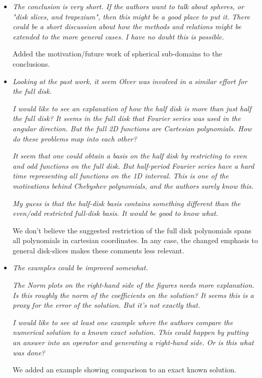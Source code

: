 \documentclass[10pt]{letter}
\newcommand{\comment}[1]{\textit{\color{bluey}#1}}
\begin{document}
\begin{itemize}[parsep=1em,leftmargin=1em]
\item \comment{The conclusion is very short. If the authors want to talk about spheres, or "disk slices, and trapezium", then this might be a good place to put it. There could be a short discussion about how the methods and relations might be extended to the more general cases. I have no doubt this is possible.}

Added the motivation/future work of spherical sub-domains to the conclusions.


\item \comment{Looking at the past work, it seem Olver was involved in a similar effort for the full disk.}

\comment{I would like to see an explanation of how the half disk is more than just half the full disk? It seems in the full disk that Fourier series was used in the angular direction. But the full 2D functions are Cartesian polynomials. How do these problems map into each other? }

\comment{It seem that one could obtain a basis on the half disk by restricting to even and odd functions on the full disk. But half-period Fourier series have a hard time representing all functions on the 1D interval. This is one of the motivations behind Chebyshev polynomials, and the authors surely know this.} 

\comment{My guess is that the half-disk basis contains something different than the even/odd restricted full-disk basis. It would be good to know what.}

We don't believe the suggested restriction of the full disk polynomials  spans all polynomials in cartesian coordinates. In any case, the changed emphasis to general disk-slices makes these comments less relevant. 


\item \comment{The examples could be improved somewhat.}

\comment{The Norm plots on the right-hand side of the figures needs more explanation. Is this roughly the norm of the coefficients on the solution? It seems this is a proxy for the error of the solution. But it's not exactly that. }

\comment{I would like to see at least one example where the authors compare the numerical solution to a known exact solution. This could happen by putting an answer into an operator and generating a right-hand side. Or is this what was done?}

We added an example showing comparison to an exact known solution.



\end{itemize}
\end{document}
